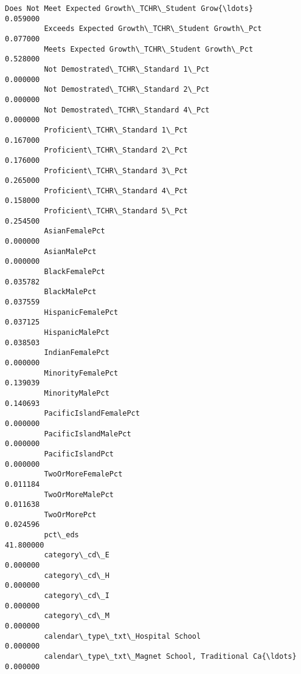 \documentclass[11pt]{article}
\begin{document}
\begin{Verbatim}[commandchars=\\\{\}]
         Does Not Meet Expected Growth\_TCHR\_Student Grow{\ldots}       0.059000   
         Exceeds Expected Growth\_TCHR\_Student Growth\_Pct          0.077000   
         Meets Expected Growth\_TCHR\_Student Growth\_Pct            0.528000   
         Not Demostrated\_TCHR\_Standard 1\_Pct                      0.000000   
         Not Demostrated\_TCHR\_Standard 2\_Pct                      0.000000   
         Not Demostrated\_TCHR\_Standard 4\_Pct                      0.000000   
         Proficient\_TCHR\_Standard 1\_Pct                           0.167000   
         Proficient\_TCHR\_Standard 2\_Pct                           0.176000   
         Proficient\_TCHR\_Standard 3\_Pct                           0.265000   
         Proficient\_TCHR\_Standard 4\_Pct                           0.158000   
         Proficient\_TCHR\_Standard 5\_Pct                           0.254500   
         AsianFemalePct                                           0.000000   
         AsianMalePct                                             0.000000   
         BlackFemalePct                                           0.035782   
         BlackMalePct                                             0.037559   
         HispanicFemalePct                                        0.037125   
         HispanicMalePct                                          0.038503   
         IndianFemalePct                                          0.000000   
         MinorityFemalePct                                        0.139039   
         MinorityMalePct                                          0.140693   
         PacificIslandFemalePct                                   0.000000   
         PacificIslandMalePct                                     0.000000   
         PacificIslandPct                                         0.000000   
         TwoOrMoreFemalePct                                       0.011184   
         TwoOrMoreMalePct                                         0.011638   
         TwoOrMorePct                                             0.024596   
         pct\_eds                                                 41.800000   
         category\_cd\_E                                            0.000000   
         category\_cd\_H                                            0.000000   
         category\_cd\_I                                            0.000000   
         category\_cd\_M                                            0.000000   
         calendar\_type\_txt\_Hospital School                        0.000000   
         calendar\_type\_txt\_Magnet School, Traditional Ca{\ldots}       0.000000   

\end{Verbatim}
\end{document}
